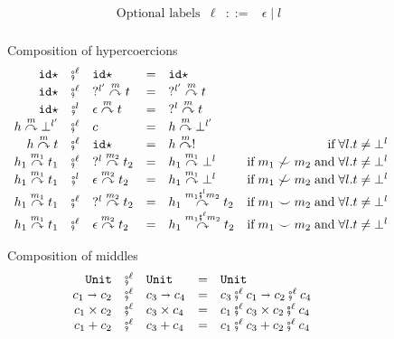\documentclass[acmsmall,review,anonymous]{acmart}\settopmatter{printfolios=true,printccs=false,printacmref=false}
\newcommand{\stxrule}[3]{\text{#2} & #1 & ::= & #3\\}
\newcommand{\comprule}[4]{#1 & \fatsemi^\ell & #2 & = & #3 & #4 \\}
\newcommand{\comprulel}[4]{#1 & \fatsemi^l & #2 & = & #3 & #4 \\}
\newcommand{\plus}[0]{+}
\newcommand{\POOunit}[0]{\mathtt{Unit}}
\newcommand{\POOfun}[2]{#1 \shortrightarrow #2}
\newcommand{\POOprod}[2]{#1 \times #2}
\newcommand{\POOsum}[2]{#1 \plus #2}
\newcommand{\sidecond}[1]{\text{if}\;#1}
\newcommand{\hyperCoercionI}[0]{\mathtt{id\star}}
\newcommand{\hyperCoercionC}[3]{#1 \overset{#2}{\curvearrowright} #3}
\begin{document}
\begin{figure}
  \[
  \begin{array}{lrcl}
  \stxrule{\ell}{Optional labels}{\epsilon \mid l}
  \end{array}
  \]
  
  Composition of hypercoercions 
  \[ 
  \begin{array}{rclclr}
  
  \comprule{
    \hyperCoercionI
  }{
    \hyperCoercionI
  }{
    \hyperCoercionI
  }{}
  
  \comprule{
    \hyperCoercionI
  }{
    \hyperCoercionC{?^{l'}}{m}{t}
  }{
    \hyperCoercionC{?^{l'}}{m}{t}
  }{}
  
  \comprulel{
    \hyperCoercionI
  }{
    \hyperCoercionC{\epsilon}{m}{t}
  }{
    \hyperCoercionC{?^{l}}{m}{t}
  }{}
  
  \comprule{
    \hyperCoercionC{h}{m}{\bot^{l'}}
  }{
    c
  }{
    \hyperCoercionC{h}{m}{\bot^{l'}}
  }{}
  
  \comprule{
    \hyperCoercionC{h}{m}{t}
  }{
    \hyperCoercionI
  }{
    \hyperCoercionC{h}{m}{!}
  }{
    \sidecond{\forall l. t \neq \bot^{l}}
  }
  
  \comprule{
    \hyperCoercionC{h_1}{m_1}{t_1}
  }{
    \hyperCoercionC{?^l}{m_2}{t_2}
  }{
    \hyperCoercionC{h_1}{m_1}{\bot^l}
  }{
    \sidecond{
       m_1 \not\smile m_2
      \; \text{and} \;
      \forall l. t \neq \bot^{l}
    }
  }

\comprulel{
\hyperCoercionC{h_1}{m_1}{t_1}
}{
\hyperCoercionC{\epsilon}{m_2}{t_2}
}{
\hyperCoercionC{h_1}{m_1}{\bot^l}
}{
\sidecond{
  m_1 \not\smile m_2
  \; \text{and} \;
  \forall l. t \neq \bot^{l}
}
}
\comprule{
\hyperCoercionC{h_1}{m_1}{t_1}
}{
\hyperCoercionC{?^l}{m_2}{t_2}
}{
\hyperCoercionC{h_1}{m_1 \fatsemi^{l} m_2}{t_2}
}{
\sidecond{
  m_1 \smile m_2
  \; \text{and} \;
  \forall l. t \neq \bot^{l}
}
}
  \comprule{
    \hyperCoercionC{h_1}{m_1}{t_1}
  }{
    \hyperCoercionC{\epsilon}{m_2}{t_2}
  }{
    \hyperCoercionC{h_1}{m_1 \fatsemi^{\ell} m_2}{t_2}
  }{
    \sidecond{
      m_1 \smile m_2
      \; \text{and} \;
      \forall l. t \neq \bot^{l}
    }
  }
  \end{array}
  \]
  
  Composition of middles 
  \[ 
  \begin{array}{rclclr}
  \comprule{\POOunit}{\POOunit}{
    \POOunit
  }{}
  \comprule{\POOfun{c_1}{c_2}}{\POOfun{c_3}{c_4}}{
    \POOfun{c_3 \fatsemi^{\ell} c_1}{c_2 \fatsemi^\ell c_4}
  }{}
  \comprule{\POOprod{c_1}{c_2}}{\POOprod{c_3}{c_4}}{
    \POOprod{c_1 \fatsemi^\ell c_3}{c_2 \fatsemi^\ell c_4}
  }{}
  \comprule{\POOsum{c_1}{c_2}}{\POOsum{c_3}{c_4}}{
    \POOsum{c_1 \fatsemi^\ell c_3}{c_2 \fatsemi^\ell c_4}
  }{}
  \end{array}
  \]
  

\end{figure}
\end{document}
